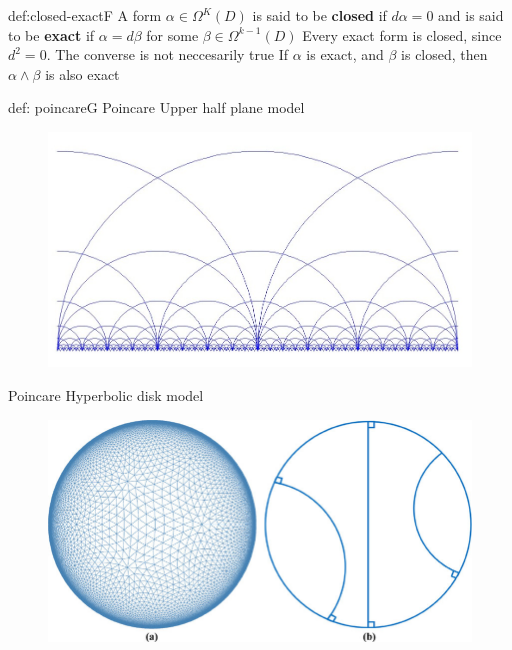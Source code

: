 \documentclass[landscape, 8pt]{extarticle}
\begin{document}
\begin{multicols}{3}
\begin{dfn}{def:closed-exact}{F}
A form \(\alpha\in \Omega^{K}(D)\) is said to be \textbf{closed} if \(d\alpha = 0\) and is said to be \textbf{exact} if \(\alpha = d\beta\) for some \(\beta\in \Omega^{k-1}(D)\)\newline
Every exact form is closed, since \(d^{2} = 0\). The converse is not neccesarily true\newline
If \(\alpha\) is exact, and \(\beta\) is closed, then \(\alpha \wedge \beta\) is also exact

\end{dfn}

\begin{dfn}{def: poincare}{G}
    Poincare Upper half plane model
    \begin{figure}[H]
        \centering
        \includegraphics[width=\linewidth]{images/halfplane1.jpg}
    \end{figure}
    
    Poincare Hyperbolic disk model
    \begin{figure}[H]
        \centering
        \includegraphics[width=\linewidth]{images/diskmodel.jpg}
    \end{figure}
\end{dfn}


\end{multicols}
\end{document}
